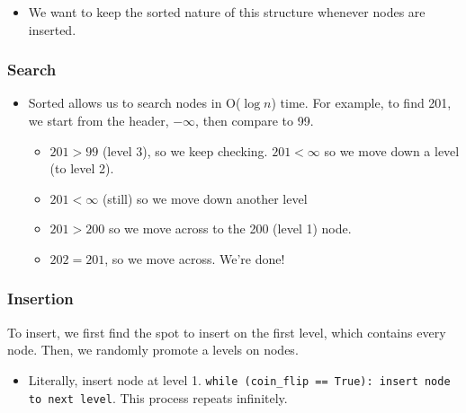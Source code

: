 \documentclass[10pt]{article}
\begin{document}
\begin{center}
\end{center}
\begin{itemize}
    \item We want to keep the sorted nature of this structure whenever nodes are inserted.  
\end{itemize}

\subsubsection*{Search}
\begin{itemize}
	\item Sorted allows us to search nodes in O($\log n$) time.  For example, to find 201, we start from the header, $-\infty$, then compare to 99.
    \begin{itemize}
	    \item $201 > 99$ (level 3), so we keep checking.  $201 < \infty$ so we move down a level (to level 2).  
        \item $201 < \infty$ (still) so we move down another level
        \item $201 > 200$ so we move across to the 200 (level 1) node.
        \item $202 = 201$, so we move across.  We're done!
    \end{itemize}
\end{itemize}

\subsubsection*{Insertion}
To insert, we first find the spot to insert on the first level, which contains every node.  Then, we randomly promote a levels on nodes.
\begin{itemize}
	\item Literally, insert node at level 1.  \texttt{while (coin\_flip == True): insert node to next level}.  This process repeats infinitely.
\end{itemize}
\end{document}
